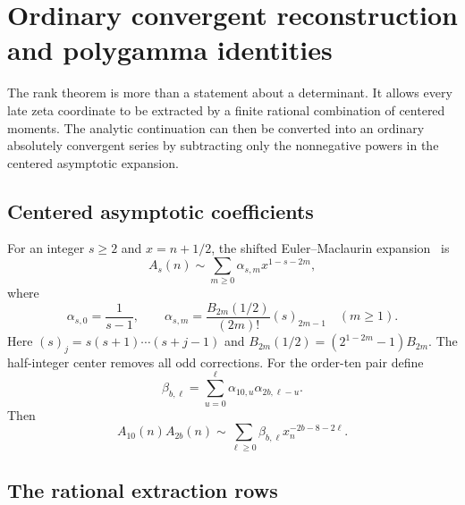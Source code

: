 \section{Ordinary convergent reconstruction and polygamma identities}
\label{sec:ordinary-reconstruction}

The rank theorem is more than a statement about a determinant.  It
allows every late zeta coordinate to be extracted by a finite rational
combination of centered moments.  The analytic continuation can then be
converted into an ordinary absolutely convergent series by subtracting
only the nonnegative powers in the centered asymptotic expansion.

\subsection{Centered asymptotic coefficients}

For an integer $s\ge2$ and $x=n+1/2$, the shifted Euler--Maclaurin
expansion~\cite{DLMF} is
\begin{equation}
 A_s(n)\sim\sum_{m\ge0}\alpha_{s,m}x^{1-s-2m},
 \label{eq:centered-tail-asymptotic}
\end{equation}
where
\begin{equation}
 \alpha_{s,0}=\frac1{s-1},
 \qquad
 \alpha_{s,m}=\frac{B_{2m}(1/2)}{(2m)!}(s)_{2m-1}
 \quad(m\ge1).
 \label{eq:alpha}
\end{equation}
Here $(s)_j=s(s+1)\cdots(s+j-1)$ and
$B_{2m}(1/2)=(2^{1-2m}-1)B_{2m}$.  The half-integer center removes all
odd corrections.  For the order-ten pair define
\begin{equation}
 \beta_{b,\ell}=\sum_{u=0}^{\ell}
       \alpha_{10,u}\alpha_{2b,\ell-u}.
 \label{eq:beta}
\end{equation}
Then
\begin{equation}
 A_{10}(n)A_{2b}(n)
 \sim\sum_{\ell\ge0}\beta_{b,\ell}x_n^{-2b-8-2\ell}.
 \label{eq:product-asymptotic}
\end{equation}

\subsection{The rational extraction rows}

